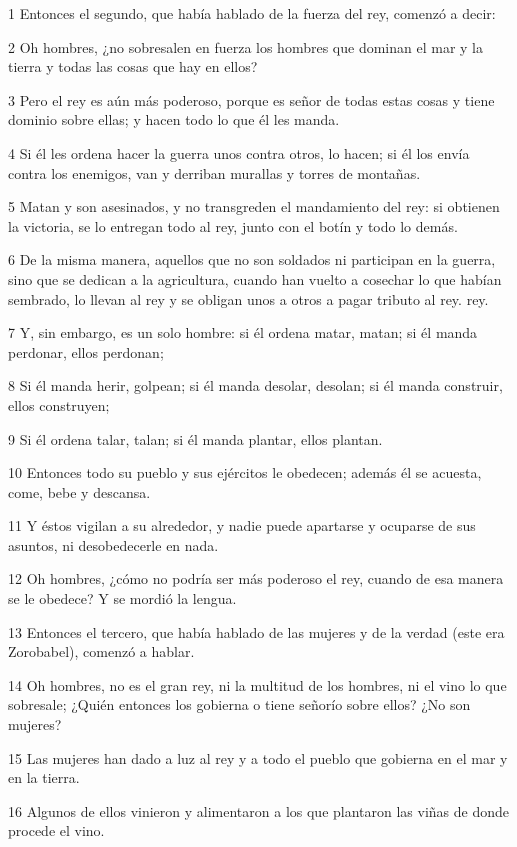 \par 1 Entonces el segundo, que había hablado de la fuerza del rey, comenzó a decir:
\par 2 Oh hombres, ¿no sobresalen en fuerza los hombres que dominan el mar y la tierra y todas las cosas que hay en ellos?
\par 3 Pero el rey es aún más poderoso, porque es señor de todas estas cosas y tiene dominio sobre ellas; y hacen todo lo que él les manda.
\par 4 Si él les ordena hacer la guerra unos contra otros, lo hacen; si él los envía contra los enemigos, van y derriban murallas y torres de montañas.
\par 5 Matan y son asesinados, y no transgreden el mandamiento del rey: si obtienen la victoria, se lo entregan todo al rey, junto con el botín y todo lo demás.
\par 6 De la misma manera, aquellos que no son soldados ni participan en la guerra, sino que se dedican a la agricultura, cuando han vuelto a cosechar lo que habían sembrado, lo llevan al rey y se obligan unos a otros a pagar tributo al rey. rey.
\par 7 Y, sin embargo, es un solo hombre: si él ordena matar, matan; si él manda perdonar, ellos perdonan;
\par 8 Si él manda herir, golpean; si él manda desolar, desolan; si él manda construir, ellos construyen;
\par 9 Si él ordena talar, talan; si él manda plantar, ellos plantan.
\par 10 Entonces todo su pueblo y sus ejércitos le obedecen; además él se acuesta, come, bebe y descansa.
\par 11 Y éstos vigilan a su alrededor, y nadie puede apartarse y ocuparse de sus asuntos, ni desobedecerle en nada.
\par 12 Oh hombres, ¿cómo no podría ser más poderoso el rey, cuando de esa manera se le obedece? Y se mordió la lengua.
\par 13 Entonces el tercero, que había hablado de las mujeres y de la verdad (este era Zorobabel), comenzó a hablar.
\par 14 Oh hombres, no es el gran rey, ni la multitud de los hombres, ni el vino lo que sobresale; ¿Quién entonces los gobierna o tiene señorío sobre ellos? ¿No son mujeres?
\par 15 Las mujeres han dado a luz al rey y a todo el pueblo que gobierna en el mar y en la tierra.
\par 16 Algunos de ellos vinieron y alimentaron a los que plantaron las viñas de donde procede el vino.
